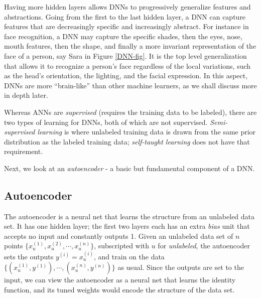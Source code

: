 \documentclass[12pt]{article}  %
\begin{document}
Having more hidden layers allows DNNs to progressively generalize features and abstractions. Going from the first to the last hidden layer, a DNN can capture features that are decreasingly specific and increasingly abstract. For instance in face recognition, a DNN may capture the specific shades, then the eyes, nose, mouth features, then the shape, and finally a more invariant representation of the face of a person, say Sara in Figure \ref{DNN-fig}. It is the top level generalization that allows it to recognize a person's face regardless of the local variations, such as the head's orientation, the lighting, and the facial expression. In this aspect, DNNs are more ``brain-like'' than other machine learners, as we shall discuss more in depth later.


Whereas ANNs are \emph{supervised} (requires the training data to be labeled), there are two types of learning for DNNs, both of which are not supervised. \emph{Semi-supervised learning} is where unlabeled training data is drawn from the same prior distribution as the labeled training data; \emph{self-taught learning} does not have that requirement.

Next, we look at an \emph{autoencoder} - a basic but fundamental component of a DNN.

\subsection{Autoencoder}

The autoencoder is a neural net that learns the structure from an unlabeled data set. It has one hidden layer; the first two layers each has an extra \emph{bias} unit that accepts no input and constantly outputs 1. Given an unlabeled data set of $n$ points $\{x^{(1)}_u, x^{(2)}_u, \cdots, x^{(n)}_u \}$, subscripted with $u$ for \emph{unlabeled}, the autoencoder sets the outputs $y^{(i)} = x^{(i)}_u$, and train on the data $\{(x^{(1)}_u, y^{(1)}), \cdots, (x^{(n)}_u, y^{(n)}) \}$ as usual. Since the outputs are set to the input, we can view the autoencoder as a neural net that learns the identity function, and its tuned weights would encode the structure of the data set.
\end{document}
